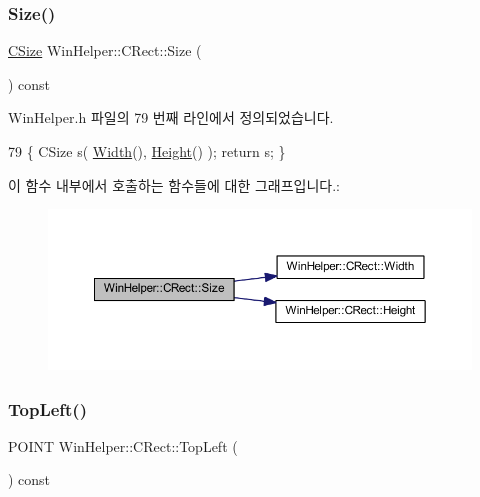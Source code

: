 \subsubsection{\texorpdfstring{Size()}{Size()}}
{\footnotesize\ttfamily \mbox{\hyperlink{class_win_helper_1_1_c_size}{C\+Size}} Win\+Helper\+::\+C\+Rect\+::\+Size (\begin{DoxyParamCaption}{ }\end{DoxyParamCaption}) const\hspace{0.3cm}{\ttfamily [inline]}}



Win\+Helper.\+h 파일의 79 번째 라인에서 정의되었습니다.


\begin{DoxyCode}
79 \{ CSize s( \mbox{\hyperlink{class_win_helper_1_1_c_rect_acde8c61514d7814ab1d7c5f91e549a80}{Width}}(), \mbox{\hyperlink{class_win_helper_1_1_c_rect_a227070170fb6da9f8539eb9d35749745}{Height}}() ); \textcolor{keywordflow}{return} s; \}
\end{DoxyCode}
이 함수 내부에서 호출하는 함수들에 대한 그래프입니다.\+:
\nopagebreak
\begin{figure}[H]
\begin{center}
\leavevmode
\includegraphics[width=350pt]{class_win_helper_1_1_c_rect_a37d2e20ba4edaf4f3ab837862ba73c11_cgraph}
\end{center}
\end{figure}
\mbox{\label{class_win_helper_1_1_c_rect_abb394a1600f994a4500c71a48db1b9ad}} 
\subsubsection{\texorpdfstring{Top\+Left()}{TopLeft()}}
{\footnotesize\ttfamily P\+O\+I\+NT Win\+Helper\+::\+C\+Rect\+::\+Top\+Left (\begin{DoxyParamCaption}{ }\end{DoxyParamCaption}) const\hspace{0.3cm}{\ttfamily [inline]}}



